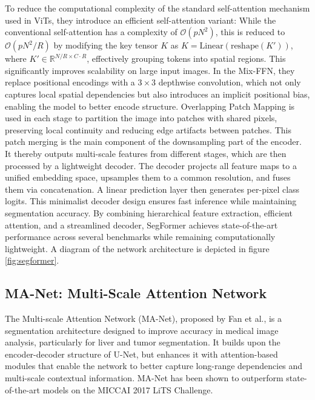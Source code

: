 To reduce the computational complexity of the standard self-attention mechanism used in ViTs, they introduce an efficient self-attention variant: While the conventional self-attention has a complexity of $\mathcal{O}(pN^2)$, this is reduced to $\mathcal{O}(pN^2 / R)$ by modifying the key tensor $K$ as $K = \text{Linear}(\text{reshape}(K'))$, where $K' \in \mathbb{R}^{N/R \times C \cdot R}$, effectively grouping tokens into spatial regions. This significantly improves scalability on large input images. In the Mix-FFN, they replace positional encodings with a $3 \times 3$ depthwise convolution, which not only captures local spatial dependencies but also introduces an implicit positional bias, enabling the model to better encode structure. Overlapping Patch Mapping is used in each stage to partition the image into patches with shared pixels, preserving local continuity and reducing edge artifacts between patches. This patch merging is the main component of the downsampling part of the encoder. It thereby outputs multi-scale features from different stages, which are then processed by a lightweight decoder. The decoder projects all feature maps to a unified embedding space, upsamples them to a common resolution, and fuses them via concatenation. A linear prediction layer then generates per-pixel class logits. This minimalist decoder design ensures fast inference while maintaining segmentation accuracy. By combining hierarchical feature extraction, efficient attention, and a streamlined decoder, SegFormer achieves state-of-the-art performance across several benchmarks while remaining computationally lightweight. A diagram of the network architecture is depicted in figure \ref{fig:segformer}.

\subsection{MA-Net: Multi-Scale Attention Network}

The Multi-scale Attention Network (MA-Net), proposed by Fan et al., is a segmentation architecture designed to improve accuracy in medical image analysis, particularly for liver and tumor segmentation. It builds upon the encoder-decoder structure of U-Net, but enhances it with attention-based modules that enable the network to better capture long-range dependencies and multi-scale contextual information. MA-Net has been shown to outperform state-of-the-art models on the MICCAI 2017 LiTS Challenge. 

